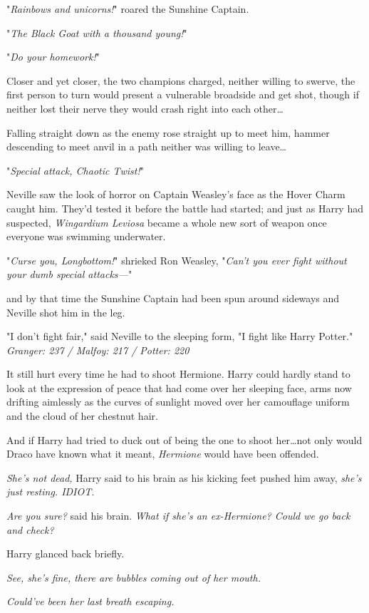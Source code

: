 "\emph{Rainbows and unicorns!}" roared the Sunshine Captain.

"\emph{The Black Goat with a thousand young!}"

"\emph{Do your homework!}"

Closer and yet closer, the two champions charged, neither willing to swerve,
the first person to turn would present a vulnerable broadside and get shot,
though if neither lost their nerve they would crash right into each
other…

Falling straight down as the enemy rose straight up to meet him, hammer
descending to meet anvil in a path neither was willing to leave…

"\emph{Special attack, Chaotic Twist!}"

Neville saw the look of horror on Captain Weasley's face as the Hover Charm
caught him. They'd tested it before the battle had started; and just as Harry
had suspected, \emph{Wingardium Leviosa} became a whole new sort of weapon once
everyone was swimming underwater.

"\emph{Curse you, Longbottom!}" shrieked Ron Weasley, "\emph{Can't you ever
fight without your dumb special attacks---}"

and by that time the Sunshine Captain had been spun around sideways and Neville
shot him in the leg.

"I don't fight fair," said Neville to the sleeping form, "I fight like Harry
Potter."
\later
\emph{Granger: 237 / Malfoy: 217 / Potter: 220}

It still hurt every time he had to shoot Hermione. Harry could hardly stand to
look at the expression of peace that had come over her sleeping face, arms now
drifting aimlessly as the curves of sunlight moved over her camouflage uniform
and the cloud of her chestnut hair.

And if Harry had tried to duck out of being the one to shoot her…not
only would Draco have known what it meant, \emph{Hermione} would have been
offended.

\emph{She's not dead,} Harry said to his brain as his kicking feet pushed him
away, \emph{she's just resting. IDIOT.}

\emph{Are you sure?} said his brain. \emph{What if she's an ex-Hermione? Could
we go back and check?}

Harry glanced back briefly.

\emph{See, she's fine, there are bubbles coming out of her mouth.}

\emph{Could've been her last breath escaping.}

